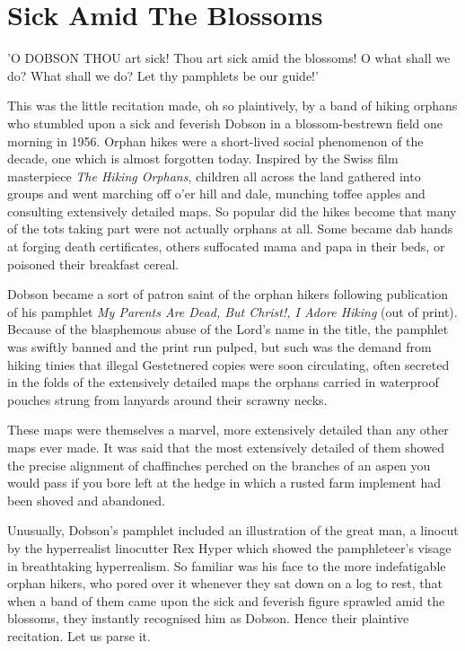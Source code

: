 \chapter{Sick Amid The Blossoms}

'O DOBSON THOU art sick! Thou art sick amid the blossoms! O what shall we do? What shall we do? Let thy pamphlets be our guide!'

This was the little recitation made, oh so plaintively, by a band of hiking orphans who stumbled upon a sick and feverish Dobson in a blossom-bestrewn field one morning in 1956. Orphan hikes were a short-lived social phenomenon of the decade, one which is almost forgotten today. Inspired by the Swiss film masterpiece \emph{The Hiking Orphans}, children all across the land gathered into groups and went marching off o'er hill and dale, munching toffee apples and consulting extensively detailed maps. So popular did the hikes become that many of the tots taking part were not actually orphans at all. Some became dab hands at forging death certificates, others suffocated mama and papa in their beds, or poisoned their breakfast cereal.

Dobson became a sort of patron saint of the orphan hikers following publication of his pamphlet \emph{My Parents Are Dead, But Christ!, I Adore Hiking} (out of print). Because of the blasphemous abuse of the Lord's name in the title, the pamphlet was swiftly banned and the print run pulped, but such was the demand from hiking tinies that illegal Gestetnered copies were soon circulating, often secreted in the folds of the extensively detailed maps the orphans carried in waterproof pouches strung from lanyards around their scrawny necks.

These maps were themselves a marvel, more extensively detailed than any other maps ever made. It was said that the most extensively detailed of them showed the precise alignment of chaffinches perched on the branches of an aspen you would pass if you bore left at the hedge in which a rusted farm implement had been shoved and abandoned.

Unusually, Dobson's pamphlet included an illustration of the great man, a linocut by the hyperrealist linocutter Rex Hyper which showed the pamphleteer's visage in breathtaking hyperrealism. So familiar was his face to the more indefatigable orphan hikers, who pored over it whenever they sat down on a log to rest, that when a band of them came upon the sick and feverish figure sprawled amid the blossoms, they instantly recognised him as Dobson. Hence their plaintive recitation. Let us parse it.

